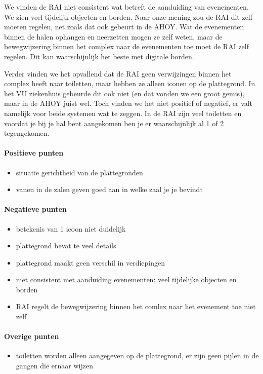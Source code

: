 We vinden de RAI niet consistent wat betreft de aanduiding van evenementen. We zien veel tijdelijk objecten en borden. Naar onze mening zou de RAI dit zelf moeten regelen, net zoals dat ook gebeurt in de AHOY. Wat de evenementen binnen de halen ophangen en neerzetten mogen ze zelf weten, maar de bewegwijzering binnen het complex naar de evenementen toe moet de RAI zelf regelen. Dit kan waarschijnlijk het beste met digitale borden.

Verder vinden we het opvallend dat de RAI geen verwijzingen binnen het complex heeft naar toiletten, maar hebben ze alleen iconen op de plattegrond. In het VU ziekenhuis gebeurde dit ook niet (en dat vonden we een groot gemis), maar in de AHOY juist wel. Toch vinden we het niet positief of negatief, er valt namelijk voor beide systemen wat te zeggen. In de RAI zijn veel toiletten en voordat je bij je hal bent aangekomen ben je er waarschijnlijk al 1 of 2 tegengekomen.


\paragraph{Positieve punten}

\begin{itemize}
\item situatie gerichtheid van de plattegronden
\item vanen in de zalen geven goed aan in welke zaal je je bevindt
\end{itemize}


\paragraph{Negatieve punten}

\begin{itemize}
\item betekenis van 1 icoon niet duidelijk
\item plattegrond bevat te veel details
\item plattegrond maakt geen verschil in verdiepingen
\item niet consistent met aanduiding evenementen: veel tijdelijke objecten en borden
\item RAI regelt de bewegwijzering binnen het comlex naar het evenement toe niet zelf
\end{itemize}


\paragraph{Overige punten}

\begin{itemize}
\item toiletten worden alleen aangegeven op de plattegrond, er zijn geen pijlen in de gangen die ernaar wijzen
\end{itemize}
